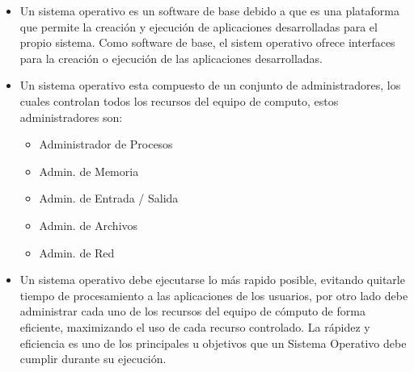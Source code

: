 \documentclass[12pt, fleqn]{report}                             %
\begin{document}
                    \begin{itemize}
                        \item 
                            Un sistema operativo es un software de base debido a que es una plataforma que permite
                            la creación y ejecución de aplicaciones desarrolladas para el propio sistema.
                            Como software de base, el sistem operativo ofrece interfaces para la creación o ejecución
                            de las aplicaciones desarrolladas.

                        \item
                            Un sistema operativo esta compuesto de un conjunto de administradores, los cuales controlan
                            todos los recursos del equipo de computo, estos administradores son: 

                            \begin{itemize}
                                \item Administrador de Procesos
                                \item Admin. de Memoria 
                                \item Admin. de Entrada / Salida 
                                \item Admin. de Archivos 
                                \item Admin. de Red 
                            \end{itemize}

                        \item
                            Un sistema operativo debe ejecutarse lo más rapido posible, evitando quitarle tiempo de
                            procesamiento a las aplicaciones de los usuarios, por otro lado debe administrar cada uno
                            de los recursos del equipo de cómputo de forma eficiente, maximizando el uso de cada
                            recurso controlado. 
                            La rápidez y eficiencia es uno de los principales u objetivos que un Sistema Operativo debe
                            cumplir durante su ejecución.
                
                    \end{itemize}
       

\end{document}
